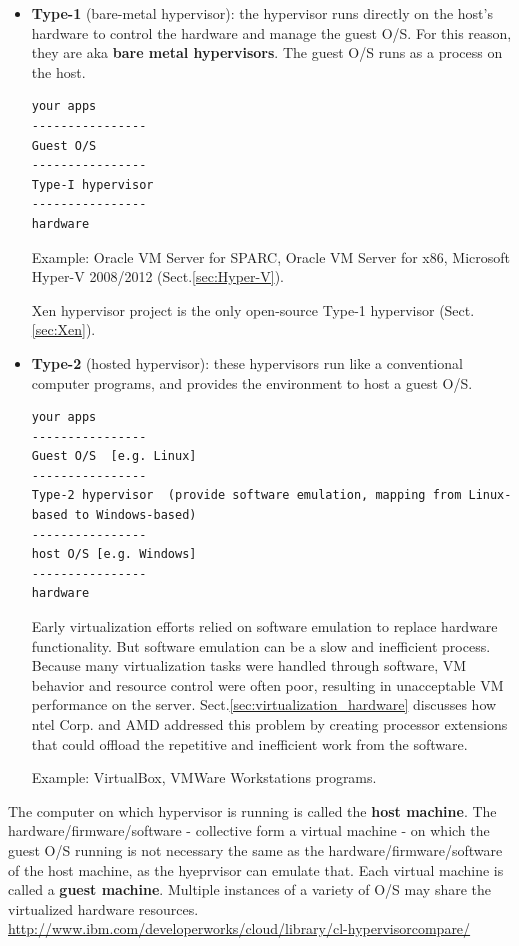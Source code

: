 \begin{itemize}
  
  \item {\bf Type-1} (bare-metal hypervisor): the hypervisor runs directly on
  the host's hardware to control the hardware and manage the guest O/S. For this
  reason, they are aka {\bf bare metal hypervisors}. The guest O/S runs as a
  process on the host.
  
\begin{verbatim}
your apps
----------------
Guest O/S
----------------
Type-I hypervisor
----------------
hardware
\end{verbatim}
  

  Example: Oracle VM Server for SPARC, Oracle VM Server for x86, Microsoft
  Hyper-V 2008/2012 (Sect.\ref{sec:Hyper-V}).
  
  Xen hypervisor project is the only open-source Type-1 hypervisor (Sect.\ref{sec:Xen}).
  
  \item {\bf Type-2} (hosted hypervisor): these hypervisors run like a
  conventional computer programs, and provides the environment to host a guest
  O/S.  

\begin{verbatim}
your apps
----------------
Guest O/S  [e.g. Linux]
----------------
Type-2 hypervisor  (provide software emulation, mapping from Linux-based to Windows-based)
----------------
host O/S [e.g. Windows]
----------------
hardware
\end{verbatim}

Early virtualization efforts relied on software emulation to replace hardware
functionality. But software emulation can be a slow and inefficient process.
Because many virtualization tasks were handled through software, VM behavior and
resource control were often poor, resulting in unacceptable VM performance on
the server. Sect.\ref{sec:virtualization_hardware} discusses how ntel Corp. and
AMD addressed this problem by creating processor extensions that could offload
the repetitive and inefficient work from the software.


  
  Example: VirtualBox, VMWare Workstations programs.
\end{itemize}

The computer on which hypervisor is running is called the {\bf host machine}.
The hardware/firmware/software - collective form a virtual machine - on which
the guest O/S running is not necessary the same as the
hardware/firmware/software of the host machine, as the hyeprvisor can emulate
that. Each virtual machine is called a {\bf guest machine}. Multiple instances
of a variety of O/S may share the virtualized hardware resources.
\url{http://www.ibm.com/developerworks/cloud/library/cl-hypervisorcompare/}
 
